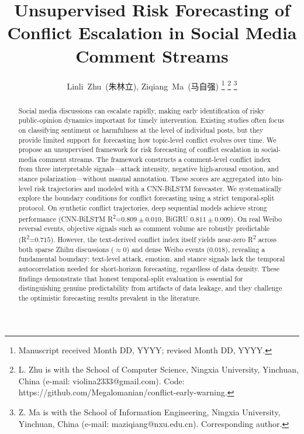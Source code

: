 \documentclass[journal]{IEEEtran}
\begin{document}
\title{Unsupervised Risk Forecasting of Conflict Escalation in Social Media Comment Streams}

\author{Linli~Zhu\ (朱林立), Ziqiang~Ma\ (马自强)%
\thanks{Manuscript received Month DD, YYYY; revised Month DD, YYYY.}%
\thanks{L. Zhu is with the School of Computer Science, Ningxia University, Yinchuan, China (e-mail: violina2333@gmail.com). Code: https://github.com/Megalomanian/conflict-early-warning.}%
\thanks{Z. Ma is with the School of Information Engineering, Ningxia University, Yinchuan, China (e-mail: maziqiang@nxu.edu.cn). Corresponding author.}}

\maketitle

\begin{abstract}
Social media discussions can escalate rapidly, making early identification of risky public-opinion dynamics important for timely intervention. Existing studies often focus on classifying sentiment or harmfulness at the level of individual posts, but they provide limited support for forecasting how topic-level conflict evolves over time. We propose an unsupervised framework for risk forecasting of conflict escalation in social-media comment streams. The framework constructs a comment-level conflict index from three interpretable signals---attack intensity, negative high-arousal emotion, and stance polarization---without manual annotation. These scores are aggregated into bin-level risk trajectories and modeled with a CNN-BiLSTM forecaster. We systematically explore the boundary conditions for conflict forecasting using a strict temporal-split protocol. On synthetic conflict trajectories, deep sequential models achieve strong performance (CNN-BiLSTM R\textsuperscript{2}=$0.809\pm0.010$, BiGRU $0.811\pm0.009$). On real Weibo reversal events, objective signals such as comment volume are robustly predictable (R\textsuperscript{2}=$0.715$). However, the text-derived conflict index itself yields near-zero R\textsuperscript{2} across both sparse Zhihu discussions ($\approx 0$) and dense Weibo events ($0.018$), revealing a fundamental boundary: text-level attack, emotion, and stance signals lack the temporal autocorrelation needed for short-horizon forecasting, regardless of data density. These findings demonstrate that honest temporal-split evaluation is essential for distinguishing genuine predictability from artifacts of data leakage, and they challenge the optimistic forecasting results prevalent in the literature.
\end{abstract}
\end{document}
